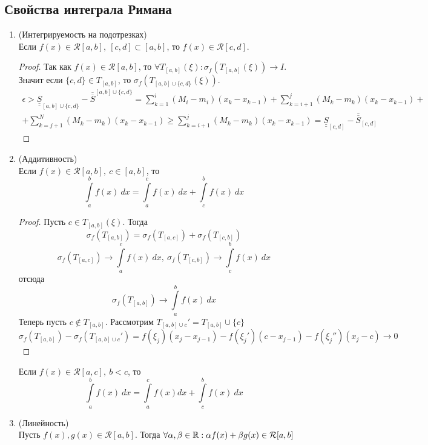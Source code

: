\subsection{Свойства интеграла Римана}
\begin{enumerate}
    \item (Интегрируемость на подотрезках)\\
    Если $f(x)\in \mathcal{R}[a,b],\ [c,d]\subset [a,b]$, то $f(x)\in \mathcal{R}[c,d]$.
\begin{proof}
    Так как $f(x)\in \mathcal{R}[a,b]$, то $\forall T_{[a,b]}(\xi): \sigma_f(T_{[a,b]}(\xi))\to I$. Значит если $\{c,d\}\in T_{[a,b]}$, то $\sigma_f(T_{[a,b]\cup \{c,d\}}(\xi))$. 
    \begin{multline*}
        \epsilon> \underline{\underline{S}}_{[a,b]\cup \{c,d\}}-\overline{\overline{S}}^{{[a,b]\cup \{c,d\}}}=\sum\limits_{k=1}^{i}(M_i-m_i)(x_k-x_{k-1})+\sum\limits_{k=i+1}^{j}(M_k-m_k)(x_k-x_{k-1})+\\
        +\sum\limits_{k=j+1}^{N}(M_k-m_k)(x_k-x_{k-1})\geq \sum\limits_{k=i+1}^{j}(M_k-m_k)(x_k-x_{k-1})=\underline{\underline{S}}_{[c,d]}-\overline{\overline{S}}_{[c,d]}
    \end{multline*}
\end{proof} 
\item (Аддитивность)\\
Если $f(x)\in \mathcal{R}[a,b],\ c\in [a,b]$, то 
\[\int\limits_{a}^{b}f(x)\ dx=\int\limits_{a}^{c} f(x)\ dx+\int\limits_{c}^{b}f(x)\ dx\]
\begin{proof}
    Пусть $c\in T_{[a,b]}(\xi)$. Тогда
    \[\sigma_f(T_{[a,b]})=\sigma_f(T_{[a,c]})+\sigma_f(T_{[c,b]})\]
    \[\sigma_f(T_{[a,c]}) \to \int\limits_{a}^{c}f(x)\ dx,\ \sigma_f(T_{[c,b]})\to \int\limits_{c}^{b}f(x)\ dx\]
    отсюда
    \[\sigma_f(T_{[a,b]})\to \int\limits_{a}^{b}f(x)\ dx\]
    Теперь пусть $c\not\in T_{[a,b]}$. Рассмотрим $T_{[a,b]\cup c}'=T_{[a,b]}\cup \{c\}$
        \[\sigma_f(T_{[a,b]})-\sigma_f(T_{[a,b]\cup c}')=f(\xi_j)(x_j-x_{j-1})-f(\xi_j')(c-x_{j-1})-f(\xi_j'')(x_j-c)\to 0\]
\end{proof} 
\begin{comm}
    Если $f(x)\in \mathcal{R}[a,c],\ b<c$, то
    \[\int\limits_{a}^{b}f(x)\ dx=\int\limits_{a}^{c}f(x)dx+\int\limits_{c}^{b}f(x)\ dx\]
\end{comm} 
\item (Линейность)\\
Пусть $f(x),g(x)\in \mathcal{R}[a,b]$. Тогда $\forall \alpha,\beta \in \mathbb{R}: \alpha f(x)+\beta g(x) \in \mathcal{R}[a,b]$

\end{enumerate}
